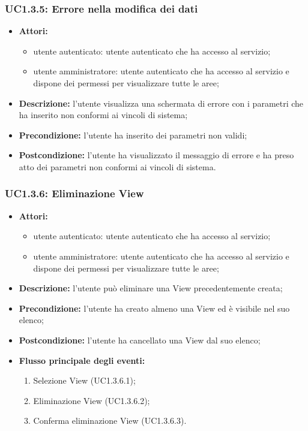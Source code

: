 \subsubsection{UC1.3.5: Errore nella modifica dei dati}

\begin{itemize}
    \item \textbf{Attori:}
    \begin{itemize}
    	\item utente autenticato: utente autenticato che ha accesso al servizio;
    	\item utente amministratore: utente autenticato che ha accesso al servizio e dispone dei permessi per visualizzare tutte le aree;
	\end{itemize}
    \item \textbf{Descrizione:} l'utente visualizza una schermata di errore con i parametri che ha inserito non conformi ai vincoli di sistema;
    \item \textbf{Precondizione:} l'utente ha inserito dei parametri non validi;
    \item \textbf{Postcondizione:} l'utente ha visualizzato il messaggio di errore e ha preso atto dei parametri non conformi ai vincoli di sistema.
\end{itemize}

\subsubsection{UC1.3.6: Eliminazione View}

\begin{itemize}
    \item \textbf{Attori:}
    \begin{itemize}
    	\item utente autenticato: utente autenticato che ha accesso al servizio;
    	\item utente amministratore: utente autenticato che ha accesso al servizio e dispone dei permessi per visualizzare tutte le aree;
	\end{itemize}
    \item \textbf{Descrizione:} l'utente può eliminare una View\gloss{} precedentemente creata;
    \item \textbf{Precondizione:} l'utente ha creato almeno una View\gloss{} ed è visibile nel suo elenco;
    \item \textbf{Postcondizione:} l'utente ha cancellato una View\gloss{} dal suo elenco;
    \item \textbf{Flusso principale degli eventi:}
    \begin{enumerate}
        \item Selezione View\gloss{} (UC1.3.6.1);
        \item Eliminazione View\gloss{} (UC1.3.6.2);
        \item Conferma eliminazione View\gloss{} (UC1.3.6.3).
    \end{enumerate}
\end{itemize}

